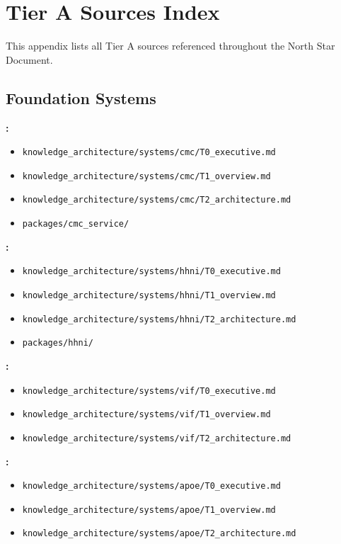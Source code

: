 
\chapter{Tier A Sources Index}

This appendix lists all Tier A sources referenced throughout the North Star Document.

\section*{Foundation Systems}

\textbf{\cmc:}
\begin{itemize}
    \item \texttt{knowledge\_architecture/systems/cmc/T0\_executive.md}
    \item \texttt{knowledge\_architecture/systems/cmc/T1\_overview.md}
    \item \texttt{knowledge\_architecture/systems/cmc/T2\_architecture.md}
    \item \texttt{packages/cmc\_service/}
\end{itemize}

\textbf{\hhni:}
\begin{itemize}
    \item \texttt{knowledge\_architecture/systems/hhni/T0\_executive.md}
    \item \texttt{knowledge\_architecture/systems/hhni/T1\_overview.md}
    \item \texttt{knowledge\_architecture/systems/hhni/T2\_architecture.md}
    \item \texttt{packages/hhni/}
\end{itemize}

\textbf{\vif:}
\begin{itemize}
    \item \texttt{knowledge\_architecture/systems/vif/T0\_executive.md}
    \item \texttt{knowledge\_architecture/systems/vif/T1\_overview.md}
    \item \texttt{knowledge\_architecture/systems/vif/T2\_architecture.md}
\end{itemize}

\textbf{\apoe:}
\begin{itemize}
    \item \texttt{knowledge\_architecture/systems/apoe/T0\_executive.md}
    \item \texttt{knowledge\_architecture/systems/apoe/T1\_overview.md}
    \item \texttt{knowledge\_architecture/systems/apoe/T2\_architecture.md}
\end{itemize}

